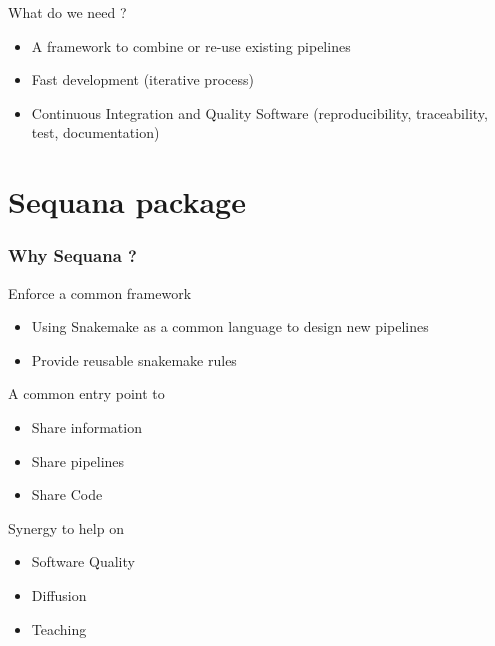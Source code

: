 \documentclass{beamer}
\begin{document}
\begin{frame}
    \begin{block}{What do we need ?}
    \begin{itemize}
     \item A framework to combine or re-use existing pipelines
     \item Fast development (iterative process)
     \item Continuous Integration and Quality Software (reproducibility, traceability, test, documentation)
    \end{itemize}
    \end{block}


 
\end{frame}
\section{Sequana package}


\begin{frame}
    \frametitle{Why Sequana ?}
    
    \begin{block}{Enforce a common framework}
    \begin{itemize}
        \item Using Snakemake as a common language to design new pipelines
        \item Provide reusable snakemake rules
    \end{itemize} 
     \end{block}

    \begin{block}{A common entry point to }
    \begin{itemize}
        \item Share information
        \item Share pipelines
        \item Share Code
    \end{itemize} 
    \end{block}

    \begin{block}{Synergy to help on }
    \begin{itemize}
        \item Software Quality
        \item Diffusion
        \item Teaching
    \end{itemize} 
    \end{block}
    
\end{frame}
\end{document}
